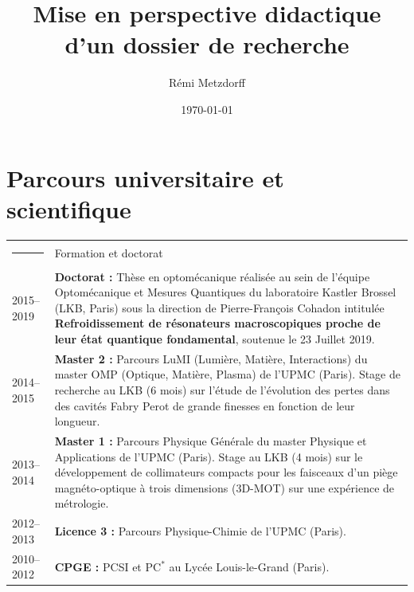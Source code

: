 \documentclass[12pt,a4paper]{article}
\title{Mise en perspective didactique d'un dossier de recherche}
\author{Rémi Metzdorff}
\date{\today}
\begin{document}
\maketitle


\section{Parcours universitaire et scientifique}

\noindent
\begin{tabular*}{\textwidth}{p{}<{\raggedleft}p{}}
\textcolor{theme}{\rule{0.12\textwidth}{2.5mm}} &
\large\textcolor{theme}{Formation et doctorat} \vspace{3pt} \\
2015--2019 &
\textbf{Doctorat :} Thèse en optomécanique réalisée au sein de l'équipe Optomécanique et Mesures Quantiques du laboratoire Kastler Brossel (LKB, Paris) sous la direction de Pierre-François Cohadon intitulée \textbf{Refroidissement de résonateurs macroscopiques proche de leur état quantique fondamental}, soutenue le 23 Juillet 2019. \vspace{3pt} \\
2014--2015 &
\textbf{Master 2 :} Parcours LuMI (Lumière, Matière, Interactions) du master OMP (Optique, Matière, Plasma) de l'UPMC (Paris).
Stage de recherche au LKB (6 mois) sur l'étude de l'évolution des pertes dans des cavités Fabry Perot de grande finesses en fonction de leur longueur. \vspace{3pt} \\
2013--2014 &
\textbf{Master 1 :} Parcours Physique Générale du master Physique et Applications de l'UPMC (Paris).
Stage au LKB (4 mois) sur le développement de collimateurs compacts pour les faisceaux d'un piège magnéto-optique à trois dimensions (3D-MOT) sur une expérience de métrologie. \vspace{3pt} \\
2012--2013 &
\textbf{Licence 3 :} Parcours Physique-Chimie de l'UPMC (Paris). \vspace{3pt} \\
2010--2012 &
\textbf{CPGE :} PCSI et PC$^*$ au Lycée Louis-le-Grand (Paris). \vspace{10pt} \\


\end{tabular*}
\end{document}
